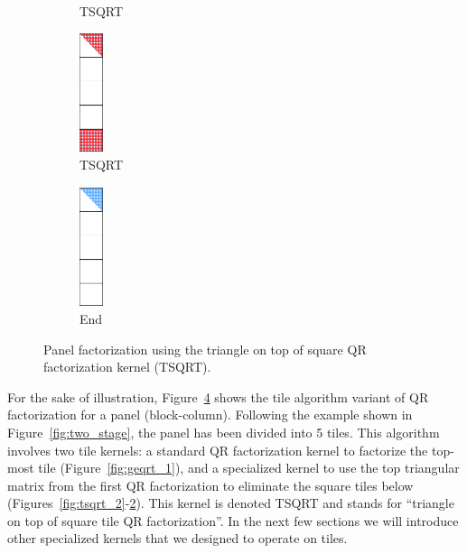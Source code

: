 \begin{figure}[h!]
\begin{subfigure}[t]{0.160 \textwidth}
      \caption{\label{fig:tsqrt_4}TSQRT}
    \end{subfigure}
    \hfill
    \begin{subfigure}[t]{0.160 \textwidth}
      \includegraphics[width=0.7cm, height=3.5cm]{fig/SVD_rect_panel_7}
      \caption{\label{fig:tsqrt_5}TSQRT}
    \end{subfigure}
    \hfill
    \begin{subfigure}[t]{0.160 \textwidth}
      \includegraphics[width=0.7cm, height=3.5cm]{fig/SVD_rect_panel_8}
      \caption{\label{fig:tsqrt_output}End}
    \end{subfigure}
    \caption{Panel factorization using the triangle on top of square QR factorization kernel (TSQRT).
    \label{fig:rect_panel}}
\end{figure}

For the sake of illustration, Figure~\ref{fig:rect_panel}
shows the tile algorithm variant of QR factorization for a panel
(block-column).
Following the example shown in Figure~\ref{fig:two_stage},
the panel has been divided into 5 tiles.
This algorithm involves two tile kernels:
a standard QR factorization kernel to
factorize the top-most tile (Figure~\ref{fig:geqrt_1}),
and a specialized kernel to use the top triangular matrix
from the first QR factorization
to eliminate the square tiles below
(Figures~\ref{fig:tsqrt_2}-\ref{fig:tsqrt_5}).
This kernel is denoted TSQRT and stands
for ``triangle on top of square tile QR factorization''.
In the next few sections we will introduce other specialized kernels
that we designed  to operate on tiles.
